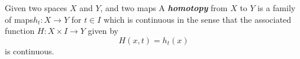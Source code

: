 \documentclass[preview]{standalone}
\begin{document}
\begin{center}
Given two spaces $X$ and $Y$, and two maps A \textbf{\textit{homotopy}} from $X$ to $Y$ is a family of maps$h_t : X \to Y$ for $t \in I$ which is continuous in the sense that the associated function $H : X \times I \to Y$ given by $$H(x,t) = h_t(x)$$ is continuous.
\end{center}
\end{document}
